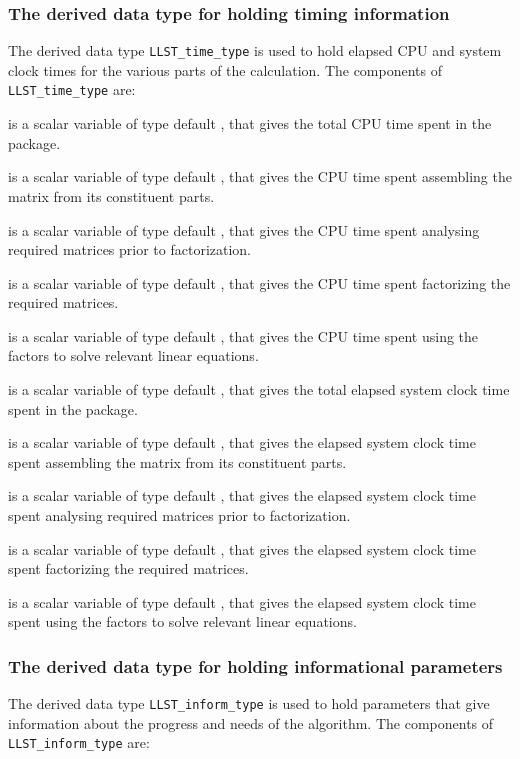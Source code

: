 \documentclass{galahad}
\newcommand{\packagename}{LLST}
\begin{document}
\subsubsection{The derived data type for holding timing
 information}\label{typetime}
The derived data type
{\tt \packagename\_time\_type}
is used to hold elapsed CPU and system clock times for the various parts of
the calculation. The components of
{\tt \packagename\_time\_type}
are:
\begin{description}
 is a scalar variable of type default \realdp, that gives
 the total CPU time spent in the package.

 is a scalar variable of type default \realdp, that gives
 the CPU time spent assembling the matrix  from its constituent parts.

 is a scalar variable of type default \realdp, that gives
 the CPU time spent analysing required matrices prior to factorization.

 is a scalar variable of type default \realdp, that gives
 the CPU time spent factorizing the required matrices.

 is a scalar variable of type default \realdp, that gives
 the CPU time spent using the factors to solve relevant linear equations.

 is a scalar variable of type default \realdp, that gives
 the total elapsed system clock time spent in the package.

 is a scalar variable of type default \realdp, that gives
 the elapsed system clock time spent assembling the matrix  from
its constituent parts.

 is a scalar variable of type default \realdp, that gives
 the elapsed system clock time spent analysing required matrices prior to
factorization.

 is a scalar variable of type default \realdp, that gives
 the elapsed system clock time spent factorizing the required matrices.

 is a scalar variable of type default \realdp, that gives
 the elapsed system clock time spent using the factors to solve relevant
linear equations.

\end{description}


\subsubsection{The derived data type for holding informational
 parameters}\label{typeinform}
The derived data type
{\tt \packagename\_inform\_type}
is used to hold parameters that give information about the progress and needs
of the algorithm. The components of
{\tt \packagename\_inform\_type}
are:
\end{document}
